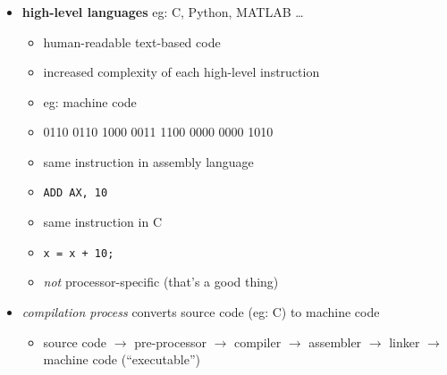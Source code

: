 \documentclass[english,14pt]{beamer}
\newcommand\red[1]{{\color{red} #1}}
\begin{document}
\begin{frame}[fragile]

\frametitle{}

\begin{itemize}
	\item \textbf{high-level languages} eg: C, Python, MATLAB \ldots

	\begin{itemize}
		\item human-readable text-based code
		\item increased complexity of each high-level instruction %
		\item eg: machine code
		\item[] 0110 0110 1000 0011 1100 0000 0000 1010
		\item same instruction in assembly language
		\item[] \texttt{ADD AX, 10}
		\item same instruction in C
		\item[] \texttt{x = x + 10;}
		\item \emph{not} processor-specific (that's a good thing)
	\end{itemize}
	
	
	\item \red{\emph{compilation process}} converts source code (eg: C) to machine code
	\begin{itemize}
		\item source code $\rightarrow$ pre-processor $\rightarrow$ compiler $\rightarrow$ assembler $\rightarrow$  linker $\rightarrow$  machine code (``executable'')
	\end{itemize}
	
\end{itemize}

\end{frame}

\end{document}
